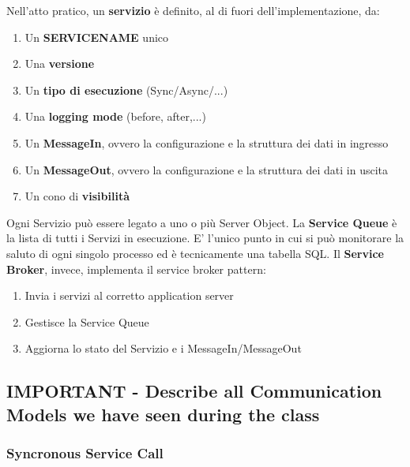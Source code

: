 \documentclass{article}
\begin{document}
Nell'atto pratico, un \textbf{servizio} è definito, al di fuori dell'implementazione, da:
\begin{enumerate}
    \item Un \textbf{SERVICENAME} unico
    \item Una \textbf{versione}
    \item Un \textbf{tipo di esecuzione} (Sync/Async/...)
    \item Una \textbf{logging mode} (before, after,...)
    \item Un \textbf{MessageIn}, ovvero la configurazione e la struttura dei dati in ingresso
    \item Un \textbf{MessageOut}, ovvero la configurazione e la struttura dei dati in uscita
    \item Un cono di \textbf{visibilità}
\end{enumerate}
Ogni Servizio può essere legato a uno o più Server Object.
\newline La \textbf{Service Queue} è la lista di tutti i Servizi in esecuzione. E' l'unico punto in cui si può monitorare la saluto di ogni singolo processo ed è tecnicamente una tabella SQL.
\newline Il \textbf{Service Broker}, invece, implementa il service broker pattern:
\begin{enumerate}
    \item Invia i servizi al corretto application server
    \item Gestisce la Service Queue
    \item Aggiorna lo stato del Servizio e i MessageIn/MessageOut
\end{enumerate}

\subsection{IMPORTANT - Describe all Communication Models we have seen during the class}
\subsubsection{Syncronous Service Call}
\end{document}
